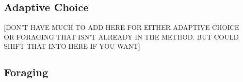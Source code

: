 \documentclass[a4paper, oneside, 11pt, onecolumn]{article}
\begin{document}
\subsection{Adaptive Choice}

[DON'T HAVE MUCH TO ADD HERE FOR EITHER ADAPTIVE CHOICE OR FORAGING THAT ISN'T ALREADY IN THE METHOD. BUT COULD SHIFT THAT INTO HERE IF YOU WANT]

\subsection{Foraging}
\end{document}
